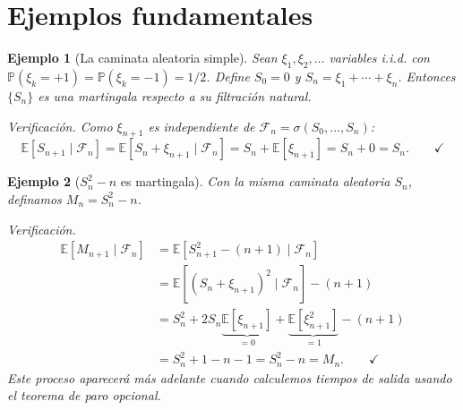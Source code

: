 \documentclass[12pt]{book}
\newtheorem{example}{Ejemplo}[chapter]
\begin{document}
\section{Ejemplos fundamentales}

\begin{example}[La caminata aleatoria simple]
    Sean $\xi_1, \xi_2, \ldots$ variables i.i.d. con $\mathbb{P}(\xi_k = +1) = \mathbb{P}(\xi_k = -1) = 1/2$. Define $S_0 = 0$ y $S_n = \xi_1 + \cdots + \xi_n$. Entonces $\{S_n\}$ es una martingala respecto a su filtración natural.

    \smallskip
    \textit{Verificación.} Como $\xi_{n+1}$ es independiente de $\mathcal{F}_n = \sigma(S_0, \ldots, S_n)$:
    \[
        \mathbb{E}[S_{n+1} \mid \mathcal{F}_n] = \mathbb{E}[S_n + \xi_{n+1} \mid \mathcal{F}_n]
        = S_n + \mathbb{E}[\xi_{n+1}] = S_n + 0 = S_n. \qquad\checkmark
    \]
\end{example}

\begin{example}[$S_n^2 - n$ es martingala]
    Con la misma caminata aleatoria $S_n$, definamos $M_n = S_n^2 - n$.

    \smallskip
    \textit{Verificación.}
    \begin{align*}
        \mathbb{E}[M_{n+1} \mid \mathcal{F}_n]
        &= \mathbb{E}[S_{n+1}^2 - (n+1) \mid \mathcal{F}_n] \\
        &= \mathbb{E}[(S_n + \xi_{n+1})^2 \mid \mathcal{F}_n] - (n+1) \\
        &= S_n^2 + 2S_n\underbrace{\mathbb{E}[\xi_{n+1}]}_{=0} + \underbrace{\mathbb{E}[\xi_{n+1}^2]}_{=1} - (n+1) \\[4pt]
        &= S_n^2 + 1 - n - 1 = S_n^2 - n = M_n. \qquad\checkmark
    \end{align*}
    Este proceso aparecerá más adelante cuando calculemos tiempos de salida usando el teorema de paro opcional.
\end{example}
\end{document}
